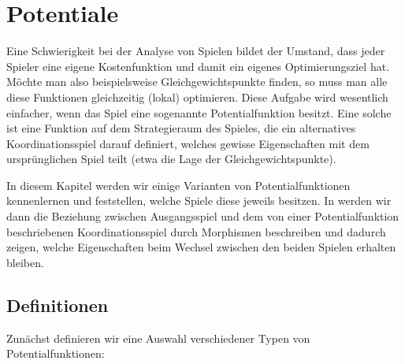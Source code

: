 \section{Potentiale}\label{sec:Potentiale}

Eine Schwierigkeit bei der Analyse von Spielen bildet der Umstand, dass jeder Spieler eine eigene Kostenfunktion und damit ein eigenes Optimierungsziel hat. Möchte man also beispielsweise Gleichgewichtspunkte finden, so muss man alle diese Funktionen gleichzeitig (lokal) optimieren. Diese Aufgabe wird wesentlich einfacher, wenn das Spiel eine sogenannte Potentialfunktion besitzt. Eine solche ist eine Funktion auf dem Strategieraum des Spieles, die ein alternatives Koordinationsspiel darauf definiert, welches gewisse Eigenschaften mit dem ursprünglichen Spiel teilt (etwa die Lage der Gleichgewichtspunkte).

In diesem Kapitel werden wir einige Varianten von Potentialfunktionen kennenlernen und feststellen, welche Spiele diese jeweils besitzen. In  werden wir dann die Beziehung zwischen Ausgangsspiel und dem von einer Potentialfunktion beschriebenen Koordinationsspiel durch Morphismen beschreiben und dadurch zeigen, welche Eigenschaften beim Wechsel zwischen den beiden Spielen erhalten bleiben.

\subsection{Definitionen}

Zunächst definieren wir eine Auswahl verschiedener Typen von Potentialfunktionen:

